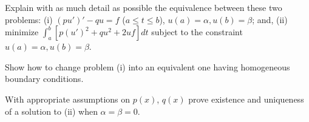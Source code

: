 \begin{alist}
\item Explain with as much detail as possible the equivalence between these
two problems: (i) $(pu')'-qu=f$ ($a\leq t\leq b$),
$u(a)=\alpha,u(b)=\beta$; and, (ii) minimize $\int_a^b[p(u')^2+q u^2+2
u f] dt$ subject to the constraint $u(a)=\alpha, u(b)=\beta$.
\item Show how to change problem (i) into an equivalent one having
homogeneous boundary conditions.
\item With appropriate assumptions on $p(x)$, $q(x)$ prove existence
and uniqueness of a solution to (ii) when $\alpha=\beta=0$.
\end{alist}
